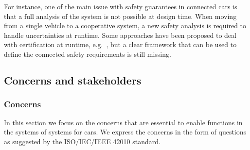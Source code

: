 %
For instance, %
one of the main issue with safety guarantees in connected cars is that a full analysis of the system is not possible at design time. When moving from a single vehicle to a cooperative system, a new safety analysis is required to handle uncertainties at runtime. Some approaches have been proposed to deal with certification at runtime, e.g.~\cite{runtime1, runtime3}, but a clear framework that can be used to define the connected safety requirements is still missing.



\subsection{Concerns and stakeholders} 





\subsubsection{Concerns}\label{vp:concerns}

In this section we focus on the concerns that are essential to enable functions in the systems of systems for cars. We express the concerns in the form of questions as suggested by the ISO/IEC/IEEE 42010 standard.

